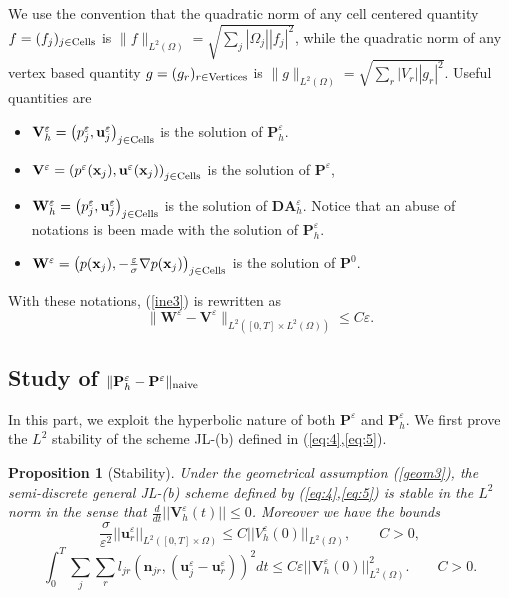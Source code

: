 \documentclass[a4paper,french,english,10pt]{article}
\newcommand\njr{\mathbf{n}_{jr}}
\newcommand\uu{\mathbf{u}}
\newcommand\eps{\varepsilon}
\newcommand\x{\mathbf{x}}
\newcommand\uj{\uu_j}
\newcommand\ur{\uu_r}
\newcommand\V{\mathbf{V}}
\newcommand\W{\mathbf{W}}
\newtheorem{pro}[theorem]{Proposition}
\begin{document}
We  use the convention that the quadratic norm
of any cell centered quantity $f=(f_j)_{j\in {\rm Cells}}$ is
$\|f\|_{L^2(\Omega)}=\sqrt{\sum_j |\Omega_j| |f_j|^2   }$, while the quadratic
norm of any vertex based quantity $g=(g_r)_{r\in {\rm Vertices}}$ is
$\|g\|_{L^2(\Omega)}=\sqrt{\sum_r |V_r| |g_r|^2   }$.
Useful  quantities  are
\begin{itemize}
\item $\mathbf V_h^\eps=\left(p^\eps_j, \uu^\eps_j \right)_
{j\in {\rm Cells}}$ is the solution of $\mathbf P_h^\eps$.
\item 
$\mathbf V^\eps=\left(p^\eps(\x_j), \uu^\eps(\x_j)  \right)_
{j\in {\rm Cells}}$ is the solution of $\mathbf P^\eps$,
\item $\mathbf W_h^\eps=\left(p^\eps_j, \uu^\eps_j \right)_
{j\in {\rm Cells}}$ is the solution of $\mathbf{DA}_h^\eps$.
Notice that an abuse of notations is been made with the solution
of $\mathbf P_h^\eps$.
\item $\mathbf W^\eps= \left(p(\x_j),-\frac\eps\sigma \nabla p(\x_j)  \right)_
{j\in {\rm Cells}} $ is the solution of $\mathbf P^0$.
\end{itemize}
With these notations,  (\ref{ine3}) is rewritten as
\begin{equation} \label{eq:enc22}
\|\W^\eps-\mathbf V^\eps\|
_{ L^2([0,T]\times L^2(\Omega)   ) } \leq C \eps.
\end{equation}


\subsection{Study of $\| \mathbf 
P_h^\varepsilon -\mathbf P^\varepsilon \|_{\rm naive}$}


In this part, we exploit the hyperbolic nature
of both 
$\mathbf P^\varepsilon$ and $\mathbf P_h^\varepsilon $.
We first prove the $L^{2}$ stability of  the scheme JL-(b) defined 
in (\ref{eq:4},\ref{eq:5}).


\begin{pro}[Stability] \label{propesti} Under the geometrical assumption (\ref{geom3}), the
semi-discrete general JL-(b) scheme defined by (\ref{eq:4},\ref{eq:5})  is
stable in the $L^2$ norm in the sense that $\frac{d}{dt}
 \vert\vert \V^{\eps}_{h}(t)
\vert\vert \leq 0$.
 Moreover we have the bounds
\begin{equation}\label{gggg}
\frac{\sigma}{\eps^2}\vert\vert \uu_r^{\eps} \vert\vert_{L^2([0,T]\times \Omega)}\leq
C 
\vert\vert
V^{\eps}_h(0)\vert\vert_{L^2( \Omega)}, \qquad C>0,
\end{equation}
\begin{equation}\label{gs}
\int_0^T\sum_j \sum_r
l_{jr}(\njr,(\uj^\eps-\ur^\eps))^{2} dt\leq C  \eps \vert\vert
\mathbf V^{\eps}_h(0)\vert\vert^2_{L^2( \Omega)}. 
\qquad C>0.
\end{equation}
\end{pro}
\end{document}
